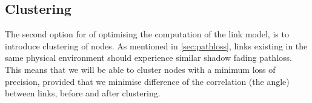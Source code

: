 \subsection{Clustering}\label{sec:clustering}
The second option for of optimising the computation of the link model, is to introduce clustering of nodes. As mentioned in \autoref{sec:pathloss}, links existing in the same physical environment should experience similar shadow fading \gls{pathloss}. This means that we will be able to cluster nodes with a minimum loss of precision, provided that we minimise difference of the correlation (the angle) between links, before and after clustering.





